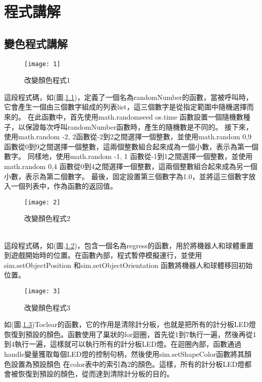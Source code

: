\chapter{程式講解}
\section{變色程式講解}
\begin{figure}[hbt!]
\begin{center}
\texttt{[image: 1]}
\caption{\Large 改變顏色程式1}\label{改變顏色程式1}
\end{center}
\end{figure} 
這段程式碼，如(圖.\ref{改變顏色程式1})，定義了一個名為randomNumber的函數，當被呼叫時，它會產生一個由三個數字組成的列表list，這三個數字是從指定範圍中隨機選擇而來的。 在此函數中，首先使用math.randomseed os.time 函數設置一個隨機數種子，以保證每次呼叫randomNumber函數時，產生的隨機數是不同的。 接下來，使用math.random -2, 2函數從-2到2之間選擇一個整數，並使用math.random 0,9函數從0到9之間選擇一個整數，這兩個整數組合起來成為一個小數，表示為第一個數字。 同樣地，使用math.random -1, 1 函數從-1到1之間選擇一個整數，並使用math.random 0,4 函數從0到4之間選擇一個整數，這兩個整數組合起來成為另一個小數，表示為第二個數字。 最後，固定設置第三個數字為1.0，並將這三個數字放入一個列表中，作為函數的返回值。\\
\begin{figure}[hbt!]
\begin{center}
\texttt{[image: 2]}
\caption{\Large 改變顏色程式2}\label{改變顏色程式2}
\end{center}
\end{figure} 
\\
這段程式碼，如(圖.\ref{改變顏色程式2})，包含一個名為regress的函數，用於將機器人和球體重置到遊戲開始時的位置。在函數內部，程式暫停模擬運行，並使用sim.setObjectPosition 和sim.setObjectOrientation 函數將機器人和球體移回初始位置。\\
\newpage
\begin{figure}[hbt!]
\begin{center}
\texttt{[image: 3]}
\caption{\Large 改變顏色程式3}\label{改變顏色程式3}
\end{center}
\end{figure} 
如(圖.\ref{改變顏色程式3})Toclear的函數，它的作用是清除計分板，也就是把所有的計分板LED燈恢復到預設的顏色。函數使用了巢狀的for迴圈，首先從1到7執行一遍，然後再從1到4執行一遍，這樣就可以執行所有的計分板LED燈。在迴圈內部，函數通過handle變量獲取每個LED燈的控制句柄，然後使用sim.setShapeColor函數將其顏色設置為預設顏色 在color表中的索引為2的顏色。這樣，所有的計分板LED燈都會被恢復到預設的顏色，從而達到清除計分板的目的。\\
